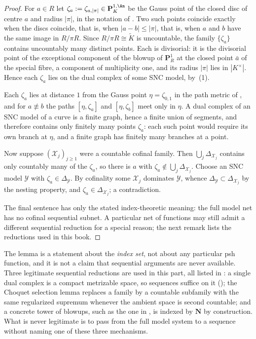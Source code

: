 \begin{proof}
For $a\in R$ let $\zeta_a:=\zeta_{a,|\pi|}\in\mathbf P^{1,\An}_K$ be the
Gauss point of the closed disc of centre $a$ and radius $|\pi|$, in the
notation of .  Two such points coincide exactly when
the discs coincide, that is, when $|a-b|\leq|\pi|$, that is, when $a$ and
$b$ have the same image in $R/\pi R$.  Since
$R/\pi R\cong\widetilde K$ is uncountable, the family
$\{\zeta_a\}$ contains uncountably many distinct points.  Each is
divisorial: it is the divisorial point of the exceptional component of the
blowup of $\mathbf P^1_R$ at the closed point $\bar a$ of the special
fibre, a component of multiplicity one, and its radius $|\pi|$ lies in
$|K^\times|$.  Hence each $\zeta_a$ lies on the dual complex of some SNC
model, by \,(1).

Each $\zeta_a$ lies at distance $1$ from the Gauss point
$\eta=\zeta_{0,1}$ in the path metric of
, and for $a\not\equiv b$ the paths
$[\eta,\zeta_a]$ and $[\eta,\zeta_b]$ meet only in $\eta$.  A dual
complex of an SNC model of a curve is a finite graph, hence a finite union
of segments, and therefore contains only finitely many points $\zeta_a$:
each such point would require its own branch at $\eta$, and a finite graph
has finitely many branches at a point.

Now suppose $(\mathcal X_j)_{j\geq1}$ were a countable cofinal family.
Then $\bigcup_j\Delta_{\mathcal X_j}$ contains only countably many of the
$\zeta_a$, so there is $a$ with
$\zeta_a\notin\bigcup_j\Delta_{\mathcal X_j}$.  Choose an SNC model
$\mathcal Y$ with $\zeta_a\in\Delta_{\mathcal Y}$.  By cofinality some
$\mathcal X_j$ dominates $\mathcal Y$, whence
$\Delta_{\mathcal Y}\subset\Delta_{\mathcal X_j}$ by the nesting property,
and $\zeta_a\in\Delta_{\mathcal X_j}$; a contradiction.

The final sentence has only the stated index-theoretic meaning: the full
model net has no cofinal sequential subnet.  A particular net of functions
may still admit a different sequential reduction for a special reason; the
next remark lists the reductions used in this book.
\end{proof}

\begin{remark}
\label{rem:ch21-nets-scope}
The lemma is a statement about the \emph{index set}, not about any
particular psh function, and it is not a claim that sequential arguments are
never available.  Three legitimate sequential reductions are used in this
part, all listed in : a single dual
complex is a compact metrizable space, so sequences suffice on it
(); the Choquet selection lemma
 replaces a family by a countable subfamily with
the same regularized supremum whenever the ambient space is second
countable; and a concrete tower of blowups, such as the one in
, is indexed by $\mathbf N$ by construction.
What is never legitimate is to pass from the full model system to a
sequence without naming one of these three mechanisms.
\end{remark}

